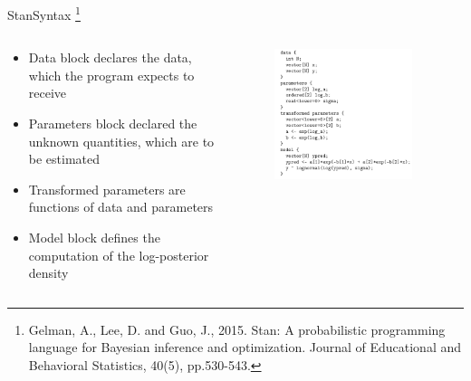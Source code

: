 \documentclass[AERbeamer%
              ,optEnglish%
              ,optBiber%
              ,optBibstyleAlphabetic%
              ,optBeamerClassicFormat%
              ]{AERlatex}%
\begin{document}
\begin{frame}[c]{Stan}{Syntax \footnote{Gelman, A., Lee, D. and Guo, J., 2015. Stan: A probabilistic programming language
                                        for Bayesian inference and optimization. Journal of Educational and Behavioral
                                        Statistics, 40(5), pp.530-543.}}
    \centering
    \begin{columns}[T]
        \begin{column}{0.48\textwidth}
            \centering
            \vspace{1.5cm}
            \begin{itemize}
                \item Data block declares the data, which the program expects to receive
                \item Parameters block declared the unknown quantities, which are to be estimated
                \item Transformed parameters are functions of data and parameters
                \item Model block defines the computation of the log-posterior density
            \end{itemize}
        \end{column}
        \begin{column}{0.48\textwidth}
            \centering
            \begin{figure}
                \centering
                \includegraphics[width=0.9\textwidth]{StanExample.png}
            \end{figure}
        \end{column}
    \end{columns}
\end{frame}
\end{document}
